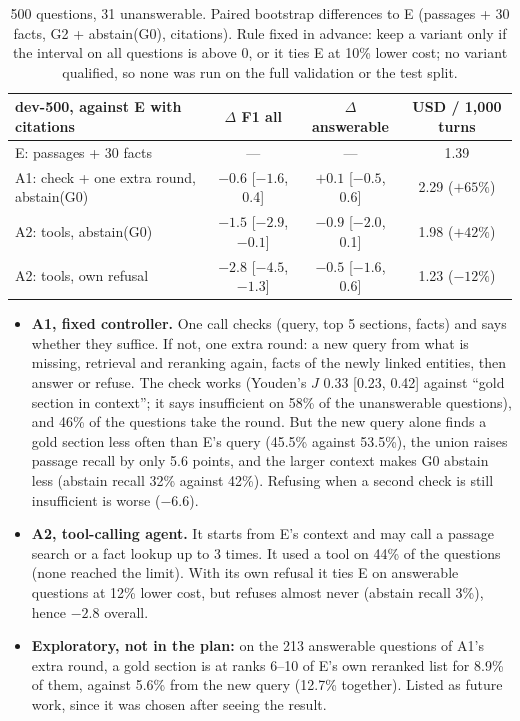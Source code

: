 \documentclass[11pt,a4paper]{article}
\begin{document}
\begin{table}[H]
\centering\small
\begin{tabular}{lccc}
\toprule
dev-500, against E with citations & $\Delta$ F1 all & $\Delta$ answerable & USD / 1,000 turns \\
\midrule
E: passages + 30 facts & --- & --- & 1.39 \\
A1: check + one extra round, abstain(G0) & $-0.6$ [$-1.6$, 0.4] & $+0.1$ [$-0.5$, 0.6] & 2.29 ($+65\%$) \\
A2: tools, abstain(G0) & $-1.5$ [$-2.9$, $-0.1$] & $-0.9$ [$-2.0$, 0.1] & 1.98 ($+42\%$) \\
A2: tools, own refusal & $-2.8$ [$-4.5$, $-1.3$] & $-0.5$ [$-1.6$, 0.6] & 1.23 ($-12\%$) \\
\bottomrule
\end{tabular}
\caption{500 questions, 31 unanswerable. Paired bootstrap differences to E (passages + 30 facts,
G2 + abstain(G0), citations). Rule fixed in advance: keep a variant only if the interval on all
questions is above 0, or it ties E at 10\% lower cost; no variant qualified, so none was run on the
full validation or the test split.}
\label{tab:agents}
\end{table}

\begin{itemize}
\item \textbf{A1, fixed controller.} One call checks (query, top 5 sections, facts) and says whether they suffice.
  If not, one extra round: a new query from what is missing, retrieval and reranking again, facts of
  the newly linked entities, then answer or refuse. The check works (Youden's $J$ 0.33 [0.23, 0.42]
  against ``gold section in context''; it says insufficient on 58\% of the unanswerable questions), and
  46\% of the questions take the round. But the new query alone finds a gold section less often than
  E's query (45.5\% against 53.5\%), the union raises passage recall by only 5.6 points, and the larger
  context makes G0 abstain less (abstain recall 32\% against 42\%). Refusing when a second check is
  still insufficient is worse ($-6.6$).
\item \textbf{A2, tool-calling agent.} It starts from E's context and may call a passage search or a fact
  lookup up to 3 times. It used a tool on 44\% of the questions (none reached the limit). With its own
  refusal it ties E on answerable questions at 12\% lower cost, but refuses almost never (abstain recall 3\%),
  hence $-2.8$ overall.
\item \textbf{Exploratory, not in the plan:} on the 213 answerable questions of A1's extra round, a gold section is
  at ranks 6--10 of E's own reranked list for 8.9\% of them, against 5.6\% from the new query
  (12.7\% together). Listed as future work, since it was chosen after seeing the result.
\end{itemize}
\end{document}
